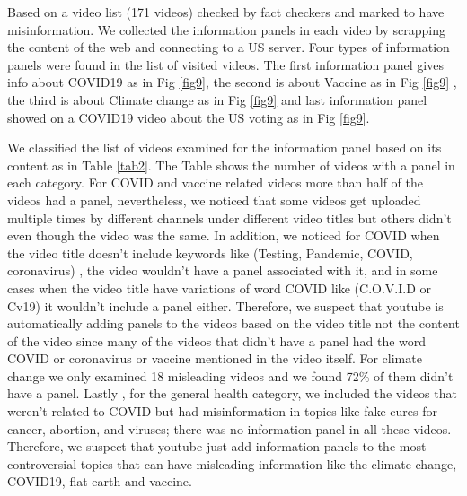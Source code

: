 \documentclass[11pt,a4paper]{article}
\begin{document}
Based on a video list (171 videos) checked by fact checkers and marked to have misinformation. We collected the information panels in each video by scrapping the content of the web and connecting to a US server. Four types of information panels were found in the list of visited videos. The first information panel gives info about COVID19 as in Fig \ref{fig9}, the second is about Vaccine as in Fig \ref{fig9} , the third is about Climate change as in Fig \ref{fig9} and last information panel showed on a COVID19 video about the US voting as in Fig \ref{fig9}.

We classified the list of videos examined for the information panel based on its content as in Table \ref{tab2}. The Table shows the number of videos with a panel in each category. For COVID and vaccine related videos more than half of the videos had a panel, nevertheless, we noticed that some videos get uploaded multiple times by different channels under different video titles but others didn’t even though the video was the same. In addition, we noticed for COVID when the video title doesn’t include keywords like (Testing, Pandemic, COVID, coronavirus) , the video wouldn’t have a panel associated with it, and in some cases when the video title have variations of word COVID like (C.O.V.I.D or Cv19) it wouldn’t include a panel either. Therefore, we suspect that youtube is automatically adding panels to the videos based on the video title not the content of the video since many of the videos that didn’t have a panel had the word COVID or coronavirus or vaccine mentioned in the video itself.
For climate change we only examined 18 misleading videos and we found 72\% of them didn’t have a panel. Lastly , for the general health category, we included the videos that weren’t related to COVID but had misinformation in topics like fake cures for cancer, abortion,  and viruses; there was no information panel in all these videos. Therefore, we suspect that youtube just add information panels to  the most controversial topics that can have misleading information like the climate change, COVID19, flat earth and  vaccine. 
\end{document}
